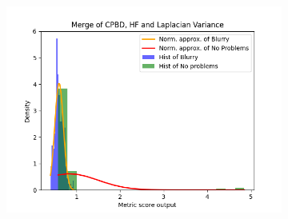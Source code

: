 \begin{figure}[H]
\begin{subfigure}[t]{0.48\textwidth}
        \caption{}
        \label{fig:CPBD_HF_LV_thresh}
    \end{subfigure}\hspace{1em}
    \begin{subfigure}[t]{0.48\textwidth}
        \includegraphics[width=\textwidth]{Figures/results_on_thresholds/output_dens_cpbd_hf_lv.png}
        \caption{}
        \label{fig:CPBD_HF_LV_dens}
    \end{subfigure}\hspace{1em}
    \caption{}
    \label{fig:CPBD_HF_LV_final}
\end{figure}


